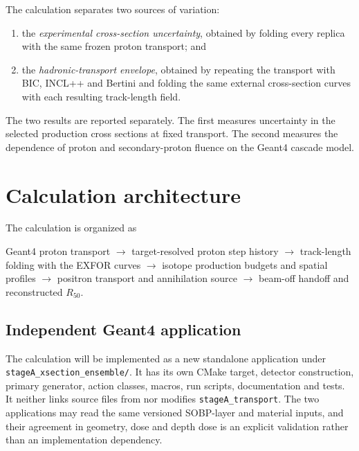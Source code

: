 \documentclass[11pt]{article}
\newcommand{\file}[1]{\texttt{#1}}
\begin{document}
The calculation separates two sources of variation:
\begin{enumerate}[nosep]
  \item the \emph{experimental cross-section uncertainty}, obtained by folding
        every replica with the same frozen proton transport; and
  \item the \emph{hadronic-transport envelope}, obtained by repeating the
        transport with BIC, INCL++ and Bertini and folding the same external
        cross-section curves with each resulting track-length field.
\end{enumerate}
The two results are reported separately.  The first measures uncertainty in
the selected production cross sections at fixed transport.  The second
measures the dependence of proton and secondary-proton fluence on the Geant4
cascade model.

\section{Calculation architecture}

The calculation is organized as
\begin{center}
\begin{minipage}{0.91\textwidth}
Geant4 proton transport
$\longrightarrow$ target-resolved proton step history
$\longrightarrow$ track-length folding with the EXFOR curves
$\longrightarrow$ isotope production budgets and spatial profiles
$\longrightarrow$ positron transport and annihilation source
$\longrightarrow$ beam-off handoff and reconstructed $R_{50}$.
\end{minipage}
\end{center}

\subsection{Independent Geant4 application}

The calculation will be implemented as a new standalone application under
\file{stageA\_xsection\_ensemble/}.  It has its own CMake target, detector
construction, primary generator, action classes, macros, run scripts,
documentation and tests.  It neither links source files from nor modifies
\file{stageA\_transport}.  The two applications may read the same versioned
SOBP-layer and material inputs, and their agreement in geometry, dose and
depth dose is an explicit validation rather than an implementation dependency.
\end{document}
